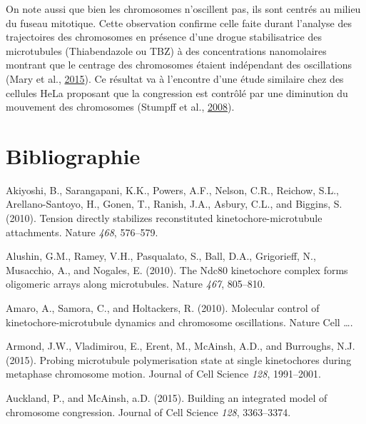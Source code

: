 \documentclass[12pt,a4paper,twoside,openright]{book}
\begin{document}
On note aussi que bien les chromosomes n'oscillent pas, ils sont centrés
au milieu du fuseau mitotique. Cette observation confirme celle faite
durant l'analyse des trajectoires des chromosomes en présence d'une
drogue stabilisatrice des microtubules (Thiabendazole ou TBZ) à des
concentrations nanomolaires montrant que le centrage des chromosomes
étaient indépendant des oscillations (Mary et al.,
\hyperref[ref-Mary2015]{2015}). Ce résultat va à l'encontre d'une étude
similaire chez des cellules HeLa proposant que la congression est
contrôlé par une diminution du mouvement des chromosomes (Stumpff et
al., \hyperref[ref-Stumpff2008]{2008}).

\backmatter

\chapter{Bibliographie}\label{bibliographie}



Akiyoshi, B., Sarangapani, K.K., Powers, A.F., Nelson, C.R., Reichow,
S.L., Arellano-Santoyo, H., Gonen, T., Ranish, J.A., Asbury, C.L., and
Biggins, S. (2010). Tension directly stabilizes reconstituted
kinetochore-microtubule attachments. Nature \emph{468}, 576--579.

Alushin, G.M., Ramey, V.H., Pasqualato, S., Ball, D.A., Grigorieff, N.,
Musacchio, A., and Nogales, E. (2010). The Ndc80 kinetochore complex
forms oligomeric arrays along microtubules. Nature \emph{467}, 805--810.

Amaro, A., Samora, C., and Holtackers, R. (2010). Molecular control of
kinetochore-microtubule dynamics and chromosome oscillations. Nature
Cell \ldots{}.

Armond, J.W., Vladimirou, E., Erent, M., McAinsh, A.D., and Burroughs,
N.J. (2015). Probing microtubule polymerisation state at single
kinetochores during metaphase chromosome motion. Journal of Cell Science
\emph{128}, 1991--2001.

Auckland, P., and McAinsh, a.D. (2015). Building an integrated model of
chromosome congression. Journal of Cell Science \emph{128}, 3363--3374.
\end{document}
